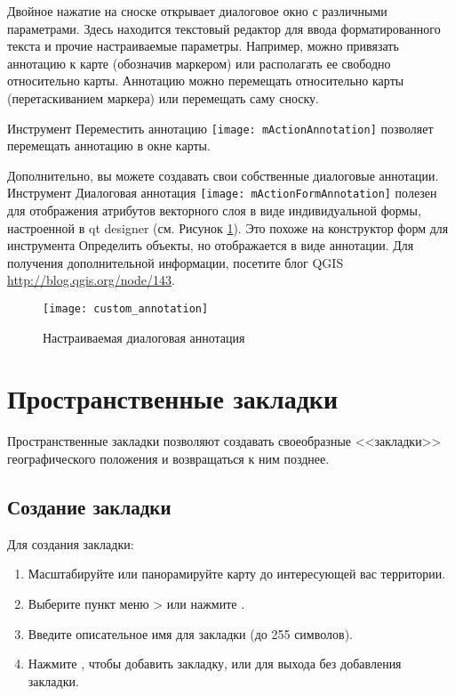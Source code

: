 Двойное нажатие на сноске открывает диалоговое окно с различными параметрами. Здесь находится текстовый редактор для ввода форматированного текста и прочие настраиваемые параметры. Например, можно привязать аннотацию к карте (обозначив маркером) или располагать ее свободно относительно карты. Аннотацию можно перемещать относительно карты (перетаскиванием маркера) или перемещать саму сноску.

Инструмент Переместить аннотацию \texttt{[image: mActionAnnotation]} позволяет перемещать аннотацию в окне карты.


Дополнительно, вы можете создавать свои собственные диалоговые аннотации. Инструмент Диалоговая аннотация
\texttt{[image: mActionFormAnnotation]} полезен для отображения атрибутов векторного слоя в виде индивидуальной формы, настроенной в qt designer (см. Рисунок \ref{fig:custom-annotations}). Это похоже на конструктор форм для инструмента Определить объекты, но отображается в виде аннотации.
Для получения дополнительной информации, посетите блог QGIS \url{http://blog.qgis.org/node/143}.

\begin{figure}[ht]
   \centering
   \texttt{[image: custom\_annotation]}
   \caption{Настраиваемая диалоговая аннотация \nixcaption}
   \label{fig:custom-annotations}
\end{figure}

\newpage

\section{Пространственные закладки}\label{sec:bookmarks}

Пространственные закладки позволяют создавать своеобразные <<закладки>> географического положения и возвращаться к ним позднее.

\subsection{Создание закладки}
Для создания закладки:
\begin{enumerate}
\item Масштабируйте или панорамируйте карту до интересующей вас территории.
\item Выберите пункт меню  >  или нажмите .
\item Введите описательное имя для закладки (до 255 символов).
\item Нажмите , чтобы добавить закладку, или  для выхода без добавления закладки.
\end{enumerate}

